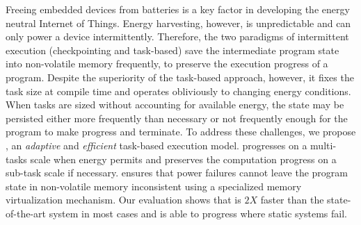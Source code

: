 Freeing embedded devices from batteries is a key factor in developing the energy neutral Internet of Things. 
Energy harvesting, however, is unpredictable and can only power a device intermittently. Therefore, the two paradigms of intermittent execution (checkpointing and task-based) save the intermediate program state into non-volatile memory frequently, to preserve the execution progress of a program. Despite the superiority of the task-based approach, however, it fixes the task size at compile time and operates obliviously to changing energy conditions. When tasks are sized without accounting for available energy, the state may be persisted either more frequently than necessary or not frequently enough for the program to make progress and terminate.
To address these challenges, we propose \sys, an \emph{adaptive} and \emph{efficient} task-based execution model. \sys progresses on a multi-tasks scale when energy permits and preserves the computation progress on a sub-task scale if necessary. \sys ensures that power failures cannot leave the program state in non-volatile memory inconsistent using a specialized memory virtualization mechanism. Our evaluation shows that \sys is $2X$ faster than the state-of-the-art system in most cases and is able to progress where static systems fail. 
